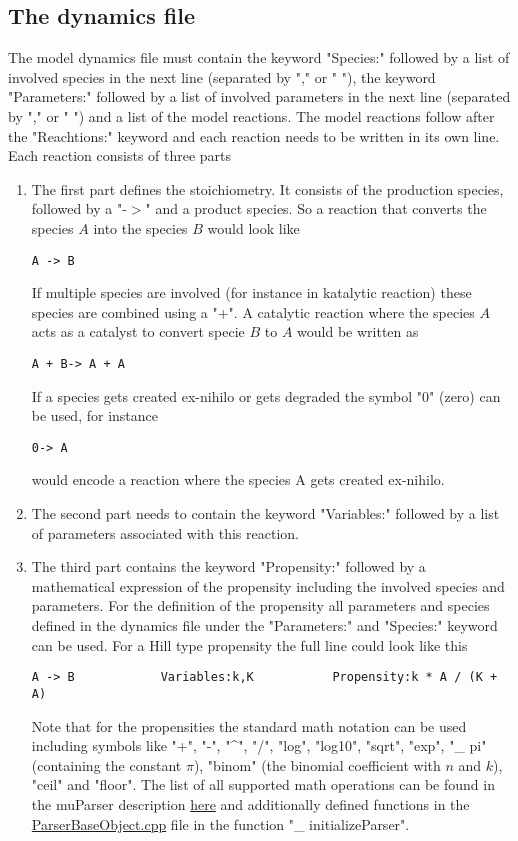 \documentclass[11pt]{article} %
\begin{document}
\subsection{The dynamics file}
The model dynamics file must contain the keyword "Species:" followed by a list of involved species in the next line (separated by "," or " "), the keyword "Parameters:" followed by a list of involved parameters in the next line (separated by "," or " ") and a list of the model reactions. 
The model reactions follow after the "Reachtions:" keyword and each reaction needs to be written in its own line. 
Each reaction consists of three parts
\begin{enumerate}
\item The first part defines the stoichiometry. It consists of the production species, followed by a "-$>$" and a product species. So a reaction that converts the species $A$ into the species $B$ would look like 
\begin{verbatim}
A -> B
\end{verbatim}
If multiple species are involved (for instance in katalytic reaction) these species are combined using a "+". A catalytic reaction where the species $A$ acts as a catalyst to convert specie $B$ to $A$ would be written as 
\begin{verbatim}
A + B-> A + A
\end{verbatim}
If a species gets created ex-nihilo or gets degraded the symbol "0" (zero) can be used, for instance
\begin{verbatim}
0-> A
\end{verbatim}
would encode a reaction where the species A gets created ex-nihilo. 

\item The second part needs to contain the keyword "Variables:" followed by a list of parameters associated with this reaction. 
\item The third part contains the keyword "Propensity:" followed by a mathematical expression of the propensity including the involved species and parameters. For the definition of the propensity all parameters and species defined in the dynamics file under the "Parameters:" and "Species:" keyword can be used. For a Hill type propensity the full line could look like this
\begin{verbatim}
A -> B	          Variables:k,K	          Propensity:k * A / (K + A)
\end{verbatim}
Note that for the propensities the standard math notation can be used including symbols like "+", "-", "\textasciicircum", "/", "log", "log10", "sqrt", "exp", "\_ pi" (containing the constant $\pi$), "binom" (the binomial coefficient with $n$ and $k$), "ceil" and "floor". The list of all supported math operations can be found in the muParser description \href{https://beltoforion.de/article.php?a=muparser&p=features&s=idDef1#idDef1}{here} and additionally defined functions in the \href{https://github.com/Mijan/LFNS/blob/publishable/src/models/ParserBaseObject.cpp}{ParserBaseObject.cpp} file in the function "\_ initializeParser".


\end{enumerate}
\end{document}
